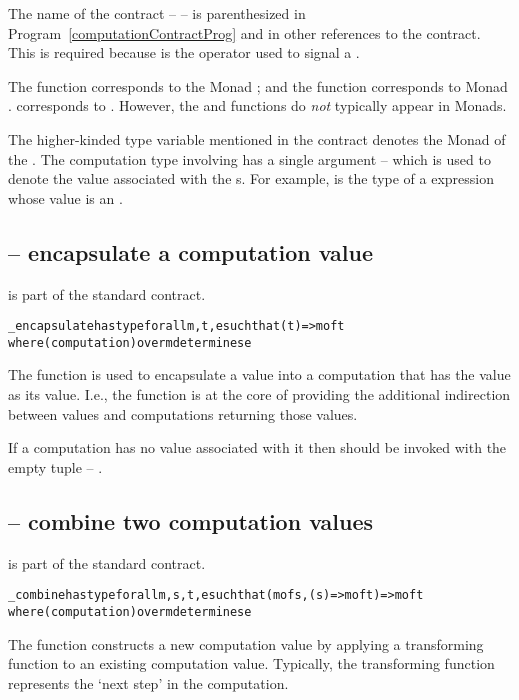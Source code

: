 \begin{aside}
The name of the contract --  -- is parenthesized in Program~\vref{computationContractProg} and in other references to the contract. This is required because  is the operator used to signal a .
\end{aside}

\begin{aside}
The  function corresponds to the Monad ; and the  function corresponds to Monad .  corresponds to . However, the  and  functions do \emph{not} typically appear in Monads.
\end{aside}

The higher-kinded type variable  mentioned in the  contract denotes the Monad of the . The computation type involving  has a single argument -- which is used to denote the value associated with the s. For example,  is the type of a  expression whose value is an .

\subsection{ -- encapsulate a computation value}
\label{encapsulateFunction}
 is part of the standard  contract.
\begin{alltt}
\_encapsulate has type for all m,t,e such that (t)=>m of t
                       where (computation) over m determines e
\end{alltt}
The  function is used to encapsulate a value into a computation that has the value as its value. I.e., the  function is at the core of providing the additional indirection between values and computations returning those values.

\begin{aside}
If a computation has no value associated with it then  should be invoked with the empty tuple -- \q{()}.
\end{aside}

\subsection{ -- combine two computation values}
\label{combineFunction}
 is part of the standard  contract.
\begin{alltt}
\_combine has type for all m,s,t,e such that (m of s, (s)=>m of t)=>m of t
                   where (computation) over m determines e
\end{alltt}
The  function constructs a new computation value by applying a transforming function to an existing computation value. Typically, the transforming function represents the `next step' in the computation.

